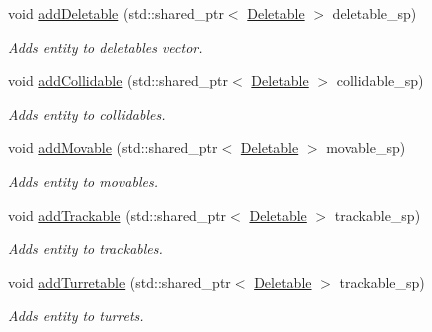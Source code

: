 \begin{DoxyCompactItemize}
void \hyperlink{classGame_abf5f8299e3e0889960a963546976817f}{add\-Deletable} (std\-::shared\-\_\-ptr$<$ \hyperlink{classDeletable}{Deletable} $>$ deletable\-\_\-sp)
\begin{DoxyCompactList}\small\item\em Adds entity to deletables vector. \end{DoxyCompactList}\item 
void \hyperlink{classGame_afece3314d2bda96eddb765a2da9ebdd0}{add\-Collidable} (std\-::shared\-\_\-ptr$<$ \hyperlink{classDeletable}{Deletable} $>$ collidable\-\_\-sp)
\begin{DoxyCompactList}\small\item\em Adds entity to collidables. \end{DoxyCompactList}\item 
void \hyperlink{classGame_a42545efdf0cdf4572d97fafba1c20dcd}{add\-Movable} (std\-::shared\-\_\-ptr$<$ \hyperlink{classDeletable}{Deletable} $>$ movable\-\_\-sp)
\begin{DoxyCompactList}\small\item\em Adds entity to movables. \end{DoxyCompactList}\item 
void \hyperlink{classGame_afb1552b97539822cb5aef6fcd08fa7b3}{add\-Trackable} (std\-::shared\-\_\-ptr$<$ \hyperlink{classDeletable}{Deletable} $>$ trackable\-\_\-sp)
\begin{DoxyCompactList}\small\item\em Adds entity to trackables. \end{DoxyCompactList}\item 
void \hyperlink{classGame_a97806aa1b86c7c908763a79b2d739439}{add\-Turretable} (std\-::shared\-\_\-ptr$<$ \hyperlink{classDeletable}{Deletable} $>$ trackable\-\_\-sp)
\begin{DoxyCompactList}\small\item\em Adds entity to turrets. \end{DoxyCompactList}\end{DoxyCompactItemize}
